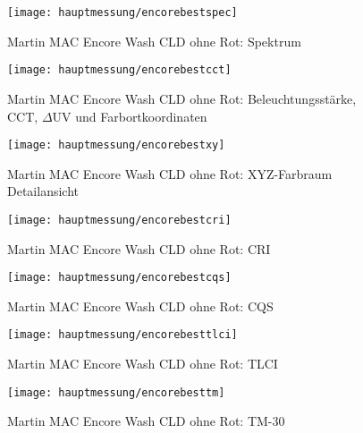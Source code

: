 \documentclass[pagesize,paper=A4,fontsize=12pt,utf8,numbers=noenddot,bibliography=totoc,listof=totoc,DIV=11,BCOR=1mm]{scrreprt}
\begin{document}
\begin{figure}[htp]     %
\centering
\texttt{[image: hauptmessung/encorebestspec]} 
\caption {Martin MAC Encore Wash CLD ohne Rot: Spektrum} 
\end{figure}

\begin{figure}[htp]     %
\centering
\texttt{[image: hauptmessung/encorebestcct]} 
\caption {Martin MAC Encore Wash CLD ohne Rot: Beleuchtungsstärke, CCT, $\Delta$UV und Farbortkoordinaten} 
\end{figure}

\begin{figure}[htp]     %
\centering
\texttt{[image: hauptmessung/encorebestxy]} 
\caption {Martin MAC Encore Wash CLD ohne Rot: XYZ-Farbraum Detailansicht} 
\end{figure}

\begin{figure}[htp]     %
\centering
\texttt{[image: hauptmessung/encorebestcri]} 
\caption {Martin MAC Encore Wash CLD ohne Rot: CRI} 
\end{figure}

\begin{figure}[htp]     %
\centering
\texttt{[image: hauptmessung/encorebestcqs]} 
\caption {Martin MAC Encore Wash CLD ohne Rot: CQS} 
\end{figure}

\begin{figure}[htp]     %
\centering
\texttt{[image: hauptmessung/encorebesttlci]} 
\caption {Martin MAC Encore Wash CLD ohne Rot: TLCI} 
\end{figure}

\begin{figure}[htp]     %
\centering
\texttt{[image: hauptmessung/encorebesttm]} 
\caption {Martin MAC Encore Wash CLD ohne Rot: TM-30} 
\end{figure}
\end{document}
